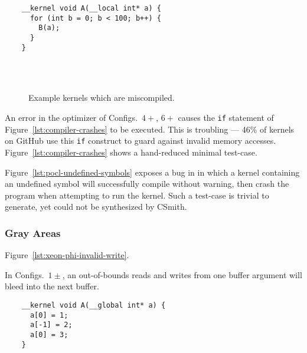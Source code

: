 \newsavebox{\PoclUndefinedSymbols}
\begin{lrbox}{\PoclUndefinedSymbols}
  \hspace{1.5em}
  \begin{lstlisting}
    __kernel void A(__local int* a) {
      for (int b = 0; b < 100; b++) {
        B(a);
      }
    }
  \end{lstlisting}
\end{lrbox}


\begin{figure}
  \centering %
  \\%
  \\%
  \caption{Example kernels which are miscompiled.}%
  \label{lst:wrong-code}%
\end{figure}


An error in the optimizer of Configs.\ $4+$, $6+$ causes the \texttt{if} statement of Figure~\ref{lst:compiler-crashes} to be executed.
This is troubling --- 46\% of kernels on GitHub use this \texttt{if} construct to guard against invalid memory accesses. Figure~\ref{lst:compiler-crashes} shows a hand-reduced minimal test-case.

Figure~\ref{lst:pocl-undefined-symbols} exposes a bug in in which a kernel containing an undefined symbol will successfully compile without warning, then crash the program when attempting to run the kernel. Such a test-case is trivial to generate, yet could not be synthesized by CSmith.


\subsubsection{Gray Areas}

Figure~\ref{lst:xeon-phi-invalid-write}.

In Configs.\ $1\pm$, an out-of-bounds reads and writes from one buffer argument will bleed into the next buffer.


\newsavebox{\XeonPhiInvalidWrite}
\begin{lrbox}{\XeonPhiInvalidWrite}
  \hspace{1.5em}
  \begin{lstlisting}
    __kernel void A(__global int* a) {
      a[0] = 1;
      a[-1] = 2;
      a[0] = 3;
    }
  \end{lstlisting}
\end{lrbox}

